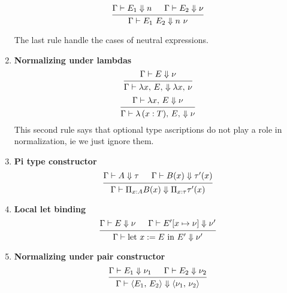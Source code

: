 \documentclass{article}
\begin{document}
\begin{enumerate}
  \[
    \begin{prooftree}
      \hypo{\Gamma \vdash E_1 \Downarrow n}
      \hypo{\Gamma \vdash E_2 \Downarrow \nu}
      \infer2{\Gamma \vdash E_1 \,\, E_2 \Downarrow n \,\, \nu}
    \end{prooftree}
  \]

  The last rule handle the cases of neutral expressions.

\item \textbf{Normalizing under lambdas} \\
  \[
    \begin{prooftree}
      \hypo{\Gamma \vdash E \Downarrow \nu}
      \infer1{\Gamma \vdash \lambda x, \, E, \, \Downarrow \lambda x, \, \nu}
    \end{prooftree}
  \]
  \[
    \begin{prooftree}
      \hypo{\Gamma \vdash \lambda x, \, E \Downarrow \nu}
      \infer1{\Gamma \vdash \lambda \, (x : T), \, E, \, \Downarrow \nu}
    \end{prooftree}
  \]
  This second rule says that optional type ascriptions do not play a role in
  normalization, ie we just ignore them.

\item \textbf{Pi type constructor} \\
  \[
    \begin{prooftree}
      \hypo{\Gamma \vdash A \Downarrow \tau}
      \hypo{\Gamma \vdash B(x) \Downarrow \tau'(x)}
      \infer2{\Gamma \vdash \Pi_{x : A} B(x) \Downarrow \Pi_{x : \tau} \tau'(x)}
    \end{prooftree}
  \]

\item \textbf{Local let binding} \\
    \[
      \begin{prooftree}
        \hypo{\Gamma \vdash E \Downarrow \nu}
        \hypo{\Gamma \vdash E'[x \mapsto \nu] \Downarrow \nu'}
        \infer2{\Gamma \vdash \text{let } x := E \text{ in } E' \Downarrow \nu'}
      \end{prooftree}
    \]

\item \textbf{Normalizing under pair constructor} \\
    \[
      \begin{prooftree}
        \hypo{\Gamma \vdash E_1 \Downarrow \nu_1}
        \hypo{\Gamma \vdash E_2 \Downarrow \nu_2}
        \infer2{\Gamma \vdash \langle E_1, \, E_2 \rangle \Downarrow \langle
          \nu_1, \, \nu_2 \rangle}
      \end{prooftree}
    \]


\end{enumerate}
\end{document}
